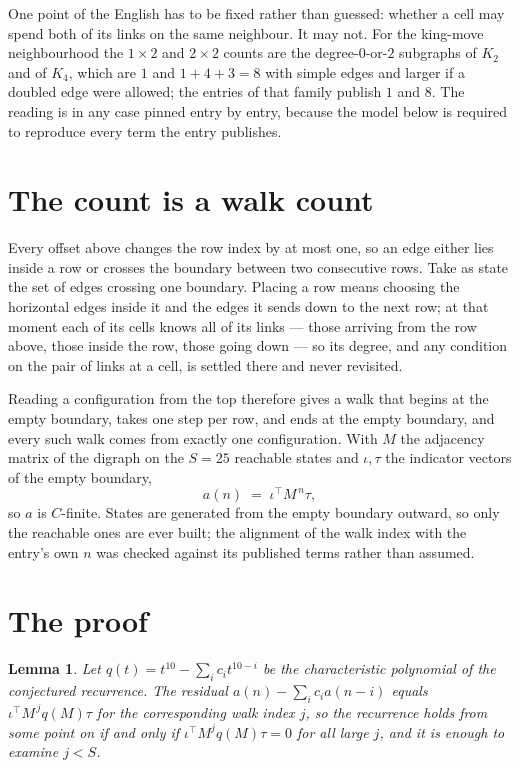 \documentclass[11pt,a4paper]{article}
\theoremstyle{plain}
\newtheorem{lemma}[theorem]{Lemma}
\theoremstyle{definition}
\begin{document}
One point of the English has to be fixed rather than guessed: whether a cell may spend both of
its links on the same neighbour. It may not. For the king-move neighbourhood the $1\times2$
and $2\times2$ counts are the degree-$0$-or-$2$ subgraphs of $K_2$ and of $K_4$, which are $1$
and $1+4+3=8$ with simple edges and larger if a doubled edge were allowed; the entries of that
family publish $1$ and $8$. The reading is in any case pinned entry by entry, because the
model below is required to reproduce every term the entry publishes.


\section{The count is a walk count}

Every offset above changes the row index by at most one, so an edge either lies inside a row
or crosses the boundary between two consecutive rows. Take as state the set of edges crossing
one boundary. Placing a row means choosing the horizontal edges inside it and the edges it
sends down to the next row; at that moment each of its cells knows all of its links --- those
arriving from the row above, those inside the row, those going down --- so its degree, and any
condition on the pair of links at a cell, is settled there and never revisited.

Reading a configuration from the top therefore gives a walk that begins at the empty boundary,
takes one step per row, and ends at the empty boundary, and every such walk comes from exactly
one configuration. With $M$ the adjacency matrix of the digraph on the $S=25$ reachable
states and $\iota,\tau$ the indicator vectors of the empty boundary,
\[
a(n)\;=\;\iota^{\!\top}M^{\,n}\tau ,
\]
so $a$ is $C$-finite. States are generated from the empty boundary outward, so only the
reachable ones are ever built; the alignment of the walk index with the entry's own $n$ was
checked against its published terms rather than assumed.

\section{The proof}

\begin{lemma}\label{lem:crit}
Let $q(t)=t^{10}-\sum_i c_it^{10-i}$ be the characteristic polynomial of the
conjectured recurrence. The residual $a(n)-\sum_ic_ia(n-i)$ equals
$\iota^{\!\top}M^{\,j}q(M)\tau$ for the corresponding walk index $j$, so the recurrence
holds from some point on if and only if $\iota^{\!\top}M^{j}q(M)\tau=0$ for all large $j$,
and it is enough to examine $j<S$.
\end{lemma}
\end{document}
